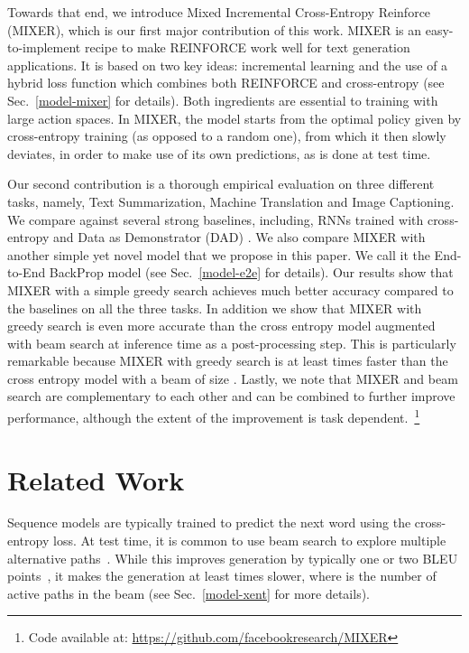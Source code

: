 \documentclass{article} \usepackage{iclr2016_conference,times}
\begin{document}
Towards that end, we introduce Mixed Incremental Cross-Entropy Reinforce (MIXER), which is our first major contribution of this work. MIXER is an easy-to-implement recipe to make REINFORCE work well for text generation applications. It is based on two key ideas: 
incremental learning and the use of a hybrid loss function which
combines both REINFORCE and cross-entropy (see Sec.~\ref{model-mixer} for details). Both ingredients are essential to training with large action spaces.
In MIXER, the model starts from the optimal policy given by cross-entropy training (as opposed to a random one), from which it then slowly deviates, 
in order to make use of its own predictions, as is done at test time.

Our second contribution is a thorough empirical evaluation on three 
different tasks, namely, Text Summarization, Machine Translation and Image Captioning.
We compare against several strong baselines, including, RNNs trained with cross-entropy and Data as Demonstrator (DAD) \citep{sbengio-nips2015, dad}. 
We also compare MIXER with another simple yet novel model that we propose in this paper. We call it the End-to-End BackProp model (see Sec.~\ref{model-e2e} for details). 
Our results show that MIXER with a simple greedy search achieves much better accuracy compared to the baselines on all the three tasks. In addition we show that MIXER with greedy search is even more accurate than the cross entropy model augmented with beam search at inference time as a post-processing step. This is particularly remarkable because MIXER with greedy search is at least  times faster than the cross entropy model with a beam of size . Lastly, we  note that MIXER and beam search are complementary to each other and can be combined to further improve performance, although the extent of the improvement is task dependent.~\footnote{Code available at: \url{https://github.com/facebookresearch/MIXER}}

\section{Related Work}
Sequence models are typically trained to predict the next
word using the cross-entropy loss. At test time, it is common to use beam search to 
explore  multiple alternative paths~\citep{sutskever2014,bahdanau-iclr2015,rush-2015}.
While this improves generation by typically one or two BLEU points~\citep{bleu}, 
it makes the generation at least  times slower, where  is the number of active 
paths in the beam (see Sec.~\ref{model-xent} for more details).
\end{document}
